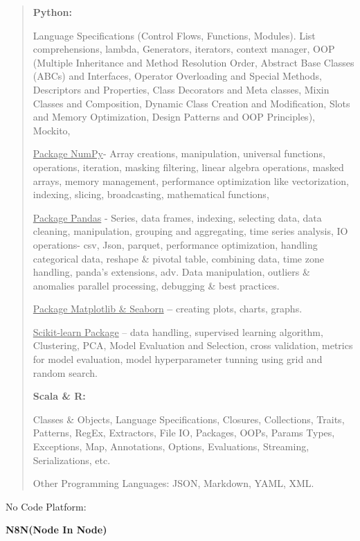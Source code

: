 \documentclass[a4paper]{article}
\begin{document}
\begin{quote}
\textbf{Python:}

Language Specifications (Control Flows, Functions, Modules). List
comprehensions, lambda, Generators, iterators, context manager, OOP
(Multiple Inheritance and Method Resolution Order, Abstract Base Classes
(ABCs) and Interfaces, Operator Overloading and Special Methods,
Descriptors and Properties, Class Decorators and Meta classes, Mixin
Classes and Composition, Dynamic Class Creation and Modification, Slots
and Memory Optimization, Design Patterns and OOP Principles), Mockito,
\hl{}

\ul{Package NumPy}- Array creations, manipulation, universal functions,
operations, iteration, masking filtering, linear algebra operations,
masked arrays, memory management, performance optimization like
vectorization, indexing, slicing, broadcasting, mathematical functions,

\ul{Package Pandas} - Series, data frames, indexing, selecting data,
data cleaning, manipulation, grouping and aggregating, time series
analysis, IO operations- csv, Json, parquet, performance optimization,
handling categorical data, reshape \& pivotal table, combining data,
time zone handling, panda's extensions, adv. Data manipulation, outliers
\& anomalies parallel processing, debugging \& best practices.

\ul{Package Matplotlib \& Seaborn} \textbf{--} creating plots, charts,
graphs.

\ul{Scikit-learn Package} -- data handling, supervised learning
algorithm, Clustering, PCA, Model Evaluation and Selection, cross
validation, metrics for model evaluation, model hyperparameter tunning
using grid and random search.

\textbf{Scala \& R:}

Classes \& Objects, Language Specifications, Closures, Collections,
Traits, Patterns, RegEx, Extractors, File IO, Packages, OOPs, Params
Types, Exceptions, Map, Annotations, Options, Evaluations, Streaming,
Serializations, etc.

Other Programming Languages: JSON, Markdown, YAML, XML.
\end{quote}

No Code Platform:

\textbf{N8N(Node In Node)}
\end{document}

